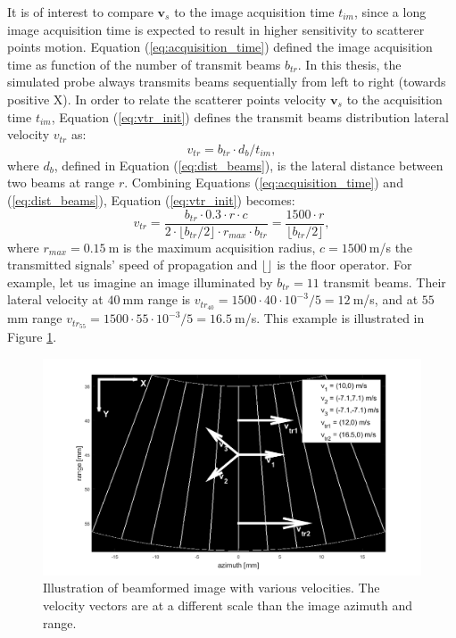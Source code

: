 It is of interest to compare $\boldsymbol{v}_s$ to the image acquisition time $t_{im}$, since a long image acquisition time is expected to result in higher sensitivity to scatterer points motion.
Equation (\ref{eq:acquisition_time}) defined the image acquisition time as function of the number of transmit beams $b_{tr}$. 
In this thesis, the simulated probe always transmits beams sequentially from left to right (towards positive X). 
In order to relate the scatterer points velocity $\boldsymbol{v}_s$ to the acquisition time $t_{im}$, Equation (\ref{eq:vtr_init}) defines the transmit beams distribution lateral velocity $v_{tr}$ as:
\begin{equation}
    v_{tr} = b_{tr} \cdot d_b / t_{im},
\label{eq:vtr_init}
\end{equation}
\noindent
where $d_b$, defined in Equation (\ref{eq:dist_beams}), is the lateral distance between two beams at range $r$. Combining Equations (\ref{eq:acquisition_time}) and (\ref{eq:dist_beams}), Equation (\ref{eq:vtr_init}) becomes:
\begin{equation}
    v_{tr} = \frac{b_{tr} \cdot 0.3 \cdot r \cdot c}{2 \cdot \lfloor b_{tr} / 2 \rfloor \cdot r_{max} \cdot b_{tr}} = \frac{1500 \cdot r}{\lfloor b_{tr} / 2 \rfloor},
\label{eq:vtr}
\end{equation}
where $r_{max} = 0.15~$m is the maximum acquisition radius, $c = 1500~$m/s the transmitted signals' speed of propagation and $\lfloor \rfloor$ is the floor operator. 
For example, let us imagine an image illuminated by $b_{tr} = 11$ transmit beams. Their lateral velocity at $40~$mm range is $v_{tr_{40}} = 1500 \cdot 40 \cdot 10^{-3} / 5 = 12~$m/s, and at $55~$mm range $v_{tr_{55}} = 1500 \cdot 55 \cdot 10^{-3} / 5 = 16.5~$m/s. This example is illustrated in Figure \ref{fig:velocities}.
\begin{figure}[ht]
    \centering
    \includegraphics[width=\linewidth]{./images/results/2.1/velocities.png}
    \caption[Illustration of beamformed image with various velocities.]{Illustration of beamformed image with various velocities. The velocity vectors are at a different scale than the image azimuth and range.}
    \label{fig:velocities}
\end{figure}

